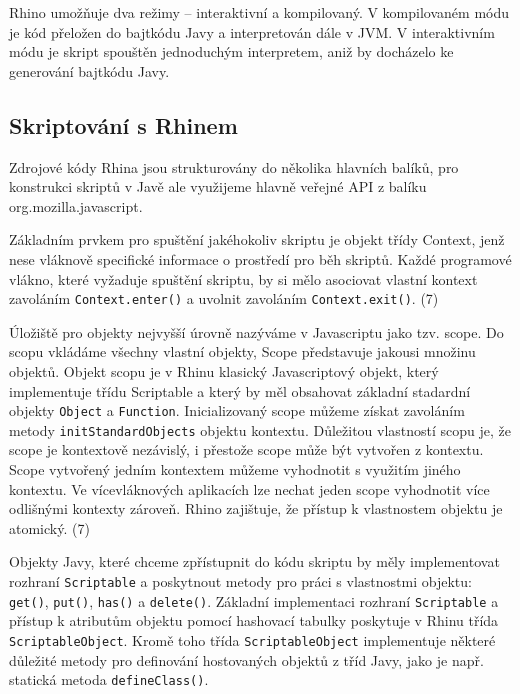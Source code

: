 Rhino umožňuje dva režimy – interaktivní a kompilovaný. V kompilovaném módu je kód přeložen do bajtkódu Javy a interpretován dále v JVM. V interaktivním módu je skript spouštěn jednoduchým interpretem, aniž by docházelo ke generování bajtkódu Javy.

\subsection{Skriptování s Rhinem}
\label{Chapter.JavaScriptInJavaAnalysis.Rhino.ScriptingWithRhino}

Zdrojové kódy Rhina jsou strukturovány do několika hlavních balíků, pro konstrukci skriptů v Javě ale využijeme hlavně veřejné API z balíku org.mozilla.javascript.

Základním prvkem pro spuštění jakéhokoliv skriptu je objekt třídy Context, jenž nese vláknově specifické informace o prostředí pro běh skriptů. Každé programové vlákno, které vyžaduje spuštění skriptu, by si mělo asociovat vlastní kontext zavoláním \texttt{Context.enter()} a uvolnit zavoláním \texttt{Context.exit()}. (7)

Úložiště pro objekty nejvyšší úrovně nazýváme v Javascriptu jako tzv. scope. Do scopu vkládáme všechny vlastní objekty, Scope představuje jakousi množinu objektů. Objekt scopu je v Rhinu klasický Javascriptový objekt, který implementuje třídu Scriptable a který by měl obsahovat základní stadardní objekty \texttt{Object} a \texttt{Function}. Inicializovaný scope můžeme získat zavoláním metody \texttt{initStandardObjects} objektu kontextu. Důležitou vlastností scopu je, že scope je kontextově nezávislý, i přestože scope může být vytvořen z kontextu. Scope vytvořený jedním kontextem můžeme vyhodnotit s využitím jiného kontextu. Ve vícevláknových aplikacích lze nechat jeden scope vyhodnotit více odlišnými kontexty zároveň. Rhino zajištuje, že přístup k vlastnostem objektu je atomický. (7)

Objekty Javy, které chceme zpřístupnit do kódu skriptu by měly implementovat rozhraní \texttt{Scriptable} a poskytnout metody pro práci s vlastnostmi objektu: \texttt{get()}, \texttt{put()}, \texttt{has()} a \texttt{delete()}. Základní implementaci rozhraní \texttt{Scriptable} a přístup k atributům objektu pomocí hashovací tabulky poskytuje v Rhinu třída \texttt{ScriptableObject}. Kromě toho třída \texttt{ScriptableObject} implementuje některé důležité metody pro definování hostovaných objektů z tříd Javy, jako je např. statická metoda \texttt{defineClass()}.

